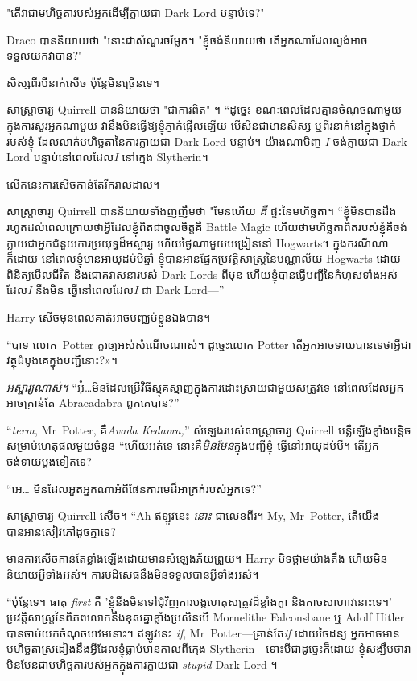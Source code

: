 {{{{"តើវាជាមហិច្ឆតារបស់អ្នកដើម្បីក្លាយជា Dark Lord បន្ទាប់ទេ?"

Draco បាននិយាយថា "នោះជាសំណួរចម្លែក។ "ខ្ញុំចង់និយាយថា តើអ្នកណាដែលល្ងង់អាចទទួលយកវាបាន?"

សិស្សពីរបីនាក់សើច ប៉ុន្តែមិនច្រើនទេ។

សាស្រ្តាចារ្យ Quirrell បាននិយាយថា "ជាការពិត" ។ “ដូច្នេះ ខណៈពេលដែលគ្មានចំណុចណាមួយក្នុងការសួរអ្នកណាមួយ វានឹងមិនធ្វើឱ្យខ្ញុំភ្ញាក់ផ្អើលឡើយ បើសិនជាមានសិស្ស ឬពីរនាក់នៅក្នុងថ្នាក់របស់ខ្ញុំ ដែលលាក់មហិច្ឆតានៃការក្លាយជា Dark Lord បន្ទាប់។ យ៉ាងណាមិញ \emph{I} ចង់ក្លាយជា Dark Lord បន្ទាប់នៅពេលដែល\emph{I} នៅក្មេង Slytherin។

លើកនេះការសើចកាន់តែរីករាលដាល។

សាស្រ្តាចារ្យ Quirrell បាននិយាយទាំងញញឹមថា "មែនហើយ \emph{គឺ} ផ្ទះនៃមហិច្ឆតា។ “ខ្ញុំ​មិន​បាន​ដឹង​រហូត​ដល់​ពេល​ក្រោយ​ថា​អ្វី​ដែល​ខ្ញុំ​ពិត​ជា​ចូលចិត្ត​គឺ Battle Magic ហើយ​ថា​មហិច្ឆតា​ពិត​របស់​ខ្ញុំ​គឺ​ចង់​ក្លាយ​ជា​អ្នក​ជំនួយ​ការ​ប្រយុទ្ធ​ដ៏​អស្ចារ្យ ហើយ​ថ្ងៃ​ណាមួយ​បង្រៀន​នៅ Hogwarts។ ក្នុងករណីណាក៏ដោយ នៅពេលខ្ញុំមានអាយុដប់បីឆ្នាំ ខ្ញុំបានអានផ្នែកប្រវត្តិសាស្ត្រនៃបណ្ណាល័យ Hogwarts ដោយពិនិត្យមើលជីវិត និងជោគវាសនារបស់ Dark Lords ពីមុន ហើយខ្ញុំបានធ្វើបញ្ជីនៃកំហុសទាំងអស់ដែល\emph{I} នឹងមិន ធ្វើនៅពេលដែល\emph{I} ជា Dark Lord—”

Harry សើចមុនពេលគាត់អាចបញ្ឈប់ខ្លួនឯងបាន។

“បាទ លោក~Potter គួរឲ្យអស់សំណើចណាស់។ ដូច្នេះ​លោក​ Potter តើ​អ្នក​អាច​ទាយ​បាន​ទេ​ថា​អ្វី​ជា​វត្ថុ​ដំបូង​គេ​ក្នុង​បញ្ជី​នោះ?»។

\emph{អស្ចារ្យណាស់។} “អ៊ុំ…មិនដែលប្រើវិធីស្មុគស្មាញក្នុងការដោះស្រាយជាមួយសត្រូវទេ នៅពេលដែលអ្នកអាចគ្រាន់តែ Abracadabra ពួកគេបាន?”

“\emph{term}, Mr~Potter, គឺ\emph{Avada Kedavra,}” សំឡេងរបស់សាស្រ្តាចារ្យ Quirrell បន្លឺឡើងខ្លាំងបន្តិចសម្រាប់ហេតុផលមួយចំនួន “ហើយអត់ទេ នោះគឺ\emph{មិនមែន}ក្នុងបញ្ជីខ្ញុំ ធ្វើនៅអាយុដប់បី។ តើអ្នកចង់ទាយម្តងទៀតទេ?

“អេ… មិនដែលអួតអ្នកណាអំពីផែនការមេដ៏អាក្រក់របស់អ្នកទេ?”

សាស្រ្តាចារ្យ Quirrell សើច។ “Ah ឥឡូវនេះ \emph{នោះ} ជាលេខពីរ។ My, Mr~Potter, តើយើងបានអានសៀវភៅដូចគ្នាទេ?

មាន​ការ​សើច​កាន់​តែ​ខ្លាំង​ឡើង​ដោយ​មាន​សំឡេង​ភ័យ​ព្រួយ។ Harry បិទថ្គាមយ៉ាងតឹង ហើយមិននិយាយអ្វីទាំងអស់។ ការបដិសេធនឹងមិនទទួលបានអ្វីទាំងអស់។

“ប៉ុន្តែទេ។ ធាតុ \emph{first} គឺ 'ខ្ញុំនឹងមិនទៅជុំវិញការបង្កហេតុសត្រូវដ៏ខ្លាំងក្លា និងកាចសាហាវនោះទេ។' ប្រវត្តិសាស្រ្តនៃពិភពលោកនឹងខុសគ្នាខ្លាំងប្រសិនបើ Mornelithe Falconsbane ឬ Adolf Hitler បានចាប់យកចំណុចបឋមនោះ។ ឥឡូវនេះ \emph{if}, Mr~Potter—គ្រាន់តែ\emph{if} ដោយចៃដន្យ អ្នកអាចមានមហិច្ឆតាស្រដៀងនឹងអ្វីដែលខ្ញុំធ្លាប់មានកាលពីក្មេង Slytherin—ទោះបីជាដូច្នេះក៏ដោយ ខ្ញុំសង្ឃឹមថាវាមិនមែនជាមហិច្ឆតារបស់អ្នកក្នុងការក្លាយជា \emph{ stupid} Dark Lord ។

}}}}
